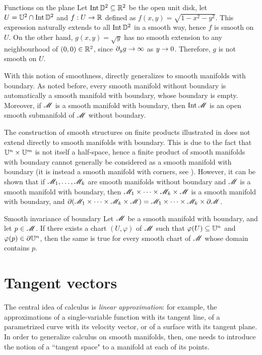 \begin{example}{Functions on the plane}{}
  Let $ \operatorname{Int} \mathbb{D}^{2} \subseteq \mathbb{R}^2 $ be the open unit disk, let $ U = \mathbb{U}^2 \cap \operatorname{Int} \mathbb{D}^{2} $ and $ f : U \rightarrow \mathbb{R} $ defined as $ f(x,y) = \sqrt{1 - x^2 - y^2} $. This expression naturally extends to all $ \operatorname{Int} \mathbb{D}^{2} $ in a smooth way, hence $ f $ is smooth on $ U $. On the other hand, $ g(x,y) = \sqrt{y} $ has no smooth extension to any neighbourhood of $ (0,0) \in \mathbb{R}^2 $, since $ \partial_y g \rightarrow \infty $ as $ y \rightarrow 0 $. Therefore, $ g $ is not smooth on $ U $.
\end{example}

With this notion of smoothness,  directly generalizes to smooth manifolds with boundary. As noted before, every smooth manifold without boundary is automatically a smooth manifold with boundary, whose boundary is empty. Moreover, if $ \mathscr{M} $ is a smooth manifold with boundary, then $ \operatorname{Int} \mathscr{M} $ is an open smooth submanifold of $ \mathscr{M} $ without boundary.

The construction of smooth structures on finite products illustrated in  does not extend directly to smooth manifolds with boundary. This is due to the fact that $ \mathbb{U}^n \times \mathbb{U}^m $ is not itself a half-space, hence a finite product of smooth manifolds with boundary cannot generally be considered as a smooth manifold with boundary (it is instead a smooth manifold with corners, see ). However, it can be shown that if $ \mathscr{M}_1 , \dots , \mathscr{M}_k $ are smooth manifolds without boundary and $ \mathscr{M} $ is a smooth manifold with boundary, then $ \mathscr{M}_1 \times \dots \times \mathscr{M}_k \times \mathscr{M} $ is a smooth manifold with boundary, and $ \partial (\mathscr{M}_1 \times \dots \times \mathscr{M}_k \times \mathscr{M}) = \mathscr{M}_1 \times \dots \times \mathscr{M}_k \times \partial \mathscr{M} $.

\begin{theorem}{Smooth invariance of boundary}{}
  Let $ \mathscr{M} $ be a smooth manifold with boundary, and let $ p \in \mathscr{M} $. If there exists a chart $ (U,\varphi) $ of $ \mathscr{M} $ such that $ \varphi(U) \subseteq \mathbb{U}^n $ and $ \varphi(p) \in \partial \mathbb{U}^n $, then the same is true for every smooth chart of $ \mathscr{M} $ whose domain contains $ p $.
\end{theorem}

\section{Tangent vectors}

The central idea of calculus is \emph{linear approximation}: for example, the approximations of a single-variable function with its tangent line, of a parametrized curve with its velocity vector, or of a surface with its tangent plane. In order to generalize calculus on smooth manifolds, then, one needs to introduce the notion of a ``tangent space" to a manifold at each of its points.

